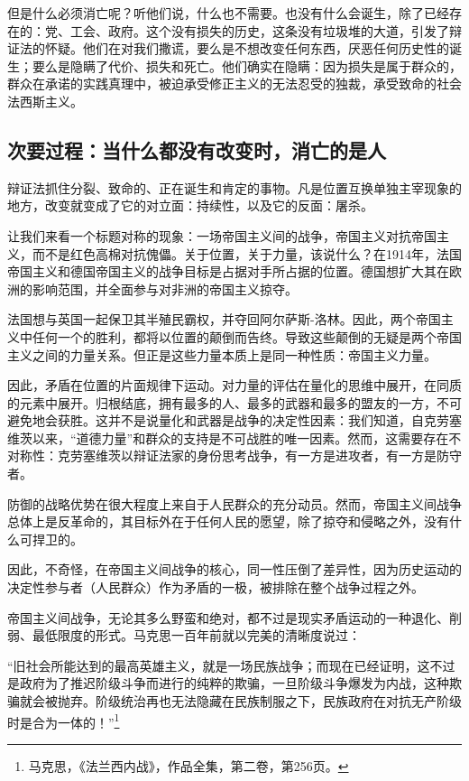 \documentclass[fontset=fandol, a4paper, 12pt, twoside]{ctexart}
\renewenvironment{quote}
  {\list{}{\rightmargin=0cm \leftmargin=2em}%
   \item\relax\small\kaishu\color{black}}
  {\endlist}
\begin{document}
但是什么必须消亡呢？听他们说，什么也不需要。也没有什么会诞生，除了已经存在的：党、工会、政府。这个没有损失的历史，这条没有垃圾堆的大道，引发了辩证法的怀疑。他们在对我们撒谎，要么是不想改变任何东西，厌恶任何历史性的诞生；要么是隐瞒了代价、损失和死亡。他们确实在隐瞒：因为损失是属于群众的，群众在承诺的实践真理中，被迫承受修正主义的无法忍受的独裁，承受致命的社会法西斯主义。

\subsection{次要过程：当什么都没有改变时，消亡的是人}

辩证法抓住分裂、致命的、正在诞生和肯定的事物。凡是位置互换单独主宰现象的地方，改变就变成了它的对立面：持续性，以及它的反面：屠杀。

让我们来看一个标题对称的现象：一场帝国主义间的战争，帝国主义对抗帝国主义，而不是红色高棉对抗傀儡。关于位置，关于力量，该说什么？在1914年，法国帝国主义和德国帝国主义的战争目标是占据对手所占据的位置。德国想扩大其在欧洲的影响范围，并全面参与对非洲的帝国主义掠夺。

法国想与英国一起保卫其半殖民霸权，并夺回阿尔萨斯-洛林。因此，两个帝国主义中任何一个的胜利，都将以位置的颠倒而告终。导致这些颠倒的无疑是两个帝国主义之间的力量关系。但正是这些力量本质上是同一种性质：帝国主义力量。

因此，矛盾在位置的片面规律下运动。对力量的评估在量化的思维中展开，在同质的元素中展开。归根结底，拥有最多的人、最多的武器和最多的盟友的一方，不可避免地会获胜。这并不是说量化和武器是战争的决定性因素：我们知道，自克劳塞维茨以来，“道德力量”和群众的支持是不可战胜的唯一因素。然而，这需要存在不对称性：克劳塞维茨以辩证法家的身份思考战争，有一方是进攻者，有一方是防守者。

防御的战略优势在很大程度上来自于人民群众的充分动员。然而，帝国主义间战争总体上是反革命的，其目标外在于任何人民的愿望，除了掠夺和侵略之外，没有什么可捍卫的。

因此，不奇怪，在帝国主义间战争的核心，同一性压倒了差异性，因为历史运动的决定性参与者（人民群众）作为矛盾的一极，被排除在整个战争过程之外。

帝国主义间战争，无论其多么野蛮和绝对，都不过是现实矛盾运动的一种退化、削弱、最低限度的形式。马克思一百年前就以完美的清晰度说过：

\begin{quote}
“旧社会所能达到的最高英雄主义，就是一场民族战争；而现在已经证明，这不过是政府为了推迟阶级斗争而进行的纯粹的欺骗，一旦阶级斗争爆发为内战，这种欺骗就会被抛弃。阶级统治再也无法隐藏在民族制服之下，民族政府在对抗无产阶级时是合为一体的！”\footnote{马克思，《法兰西内战》，作品全集，第二卷，第256页。}
\end{quote}
\end{document}
